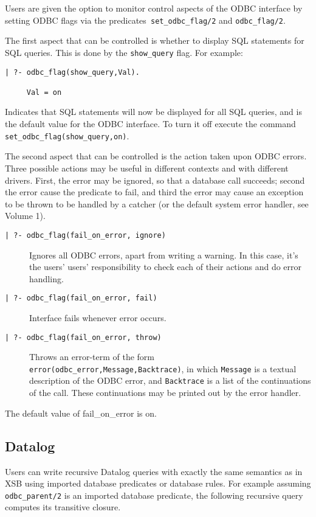 Users are given the option to monitor control aspects of the ODBC
interface by setting ODBC flags via the predicates{\tt
set\_odbc\_flag/2} and {\tt odbc\_flag/2}.

The first aspect that can be controlled is whether to display SQL
statements for SQL queries.  This is done by the {\tt show\_query}
flag.  For example: 
%
\begin{verbatim}
| ?- odbc_flag(show_query,Val).

     Val = on
\end{verbatim}
%
Indicates that SQL statements will now be displayed for all SQL
queries, and is the default value for the ODBC interface.  To turn it
off execute the command {\tt set\_odbc\_flag(show\_query,on)}.  

The second aspect that can be controlled is the action taken upon ODBC
errors.  Three possible actions may be useful in different contexts
and with different drivers.  First, the error may be ignored, so that
a database call succeeds; second the error cause the predicate to
fail, and third the error may cause an exception to be thrown to be
handled by a catcher (or the default system error handler, see Volume
1).
%
\begin{description}
%
\item[\tt | ?- odbc\_flag(fail\_on\_error, ignore)] Ignores all ODBC
errors, apart from writing a warning.  In this case, it's the users'
users' responsibility to check each of their actions and do error
handling.
%
\item[\tt | ?- odbc\_flag(fail\_on\_error, fail)] Interface fails whenever 
error occurs.
%
\item[\tt | ?- odbc\_flag(fail\_on\_error, throw)] Throws an
error-term of the form {\tt error(odbc\_error,Message,Backtrace)}, in
which {\tt Message} is a textual description of the ODBC error, and
{\tt Backtrace} is a list of the continuations of the call.  These
continuations may be printed out by the error handler.
\end{description}
%
The default value of fail\_on\_error is on.


\subsection{Datalog}
Users can write recursive Datalog queries with exactly the same
semantics as in XSB using imported database predicates or database
rules.  For example assuming {\tt odbc\_parent/2} is an imported database
predicate, the following recursive query computes its transitive closure.

